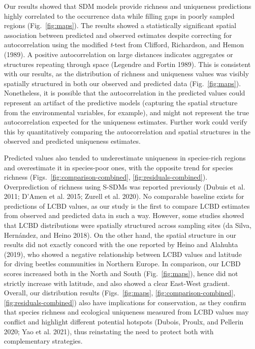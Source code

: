 \documentclass[10pt,oneside]{article}
\begin{document}
Our results showed that SDM models provide richness and uniqueness
predictions highly correlated to the occurrence data while filling gaps
in poorly sampled regions (Fig.~\ref{fig:maps}). The results showed a
statistically significant spatial association between predicted and
observed estimates despite correcting for autocorrelation using the
modified \emph{t}-test from Clifford, Richardson, and Hemon (1989). A
positive autocorrelation on large distances indicates aggregates or
structures repeating through space (Legendre and Fortin 1989). This is
consistent with our results, as the distribution of richness and
uniqueness values was visibly spatially structured in both our observed
and predicted data (Fig.~\ref{fig:maps}). Nonetheless, it is possible
that the autocorrelation in the predicted values could represent an
artifact of the predictive models (capturing the spatial structure from
the environmental variables, for example), and might not represent the
true autocorrelation expected for the uniqueness estimates. Further work
could verify this by quantitatively comparing the autocorrelation and
spatial structures in the observed and predicted uniqueness estimates.

Predicted values also tended to underestimate uniqueness in species-rich
regions and overestimate it in species-poor ones, with the opposite
trend for species richness
(Figs.~\ref{fig:comparison-combined}, \ref{fig:residuals-combined}).
Overprediction of richness using S-SDMs was reported previously (Dubuis
et al. 2011; D'Amen et al. 2015; Zurell et al. 2020). No comparable
baseline exists for predictions of LCBD values, as our study is the
first to compare LCBD estimates from observed and predicted data in such
a way. However, some studies showed that LCBD distributions were
spatially structured across sampling sites (da Silva, Hernández, and
Heino 2018). On the other hand, the spatial structure in our results did
not exactly concord with the one reported by Heino and Alahuhta (2019),
who showed a negative relationship between LCBD values and latitude for
diving beetles communities in Northern Europe. In comparison, our LCBD
scores increased both in the North and South (Fig.~\ref{fig:maps}),
hence did not strictly increase with latitude, and also showed a clear
East-West gradient. Overall, our distribution results
(Figs.~\ref{fig:maps}, \ref{fig:comparison-combined}, \ref{fig:residuals-combined})
also have implications for conservation, as they confirm that species
richness and ecological uniqueness measured from LCBD values may
conflict and highlight different potential hotspots (Dubois, Proulx, and
Pellerin 2020; Yao et al. 2021), thus reinstating the need to protect
both with complementary strategies.
\end{document}
